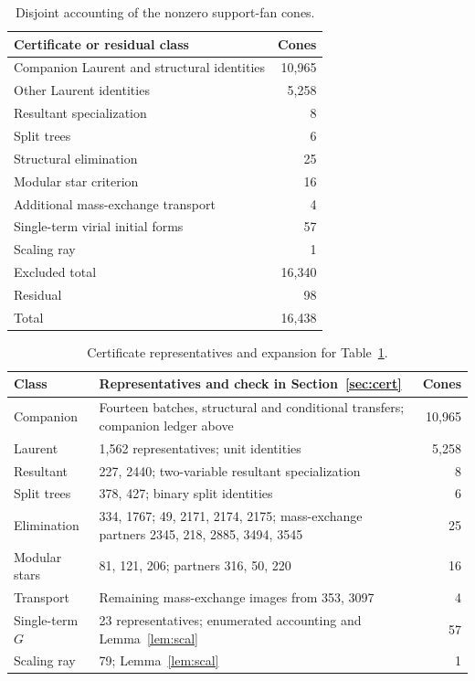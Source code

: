 \documentclass[11pt]{amsart}
\theoremstyle{definition}\newtheorem{definition}[theorem]{Definition}\theoremstyle{remark}\newtheorem{remark}[theorem]{Remark}
\begin{document}
\begin{table}[ht]
\centering
\caption{Disjoint accounting of the nonzero support-fan cones.}\label{tab:coverage}
\begin{tabular}{lr}
\toprule
Certificate or residual class&Cones\\
\midrule
Companion Laurent and structural identities&10,965\\
Other Laurent identities&5,258\\
Resultant specialization&8\\
Split trees&6\\
Structural elimination&25\\
Modular star criterion&16\\
Additional mass-exchange transport&4\\
Single-term virial initial forms&57\\
Scaling ray&1\\
\midrule
Excluded total&16,340\\
Residual&98\\
\midrule
Total&16,438\\
\bottomrule
\end{tabular}
\end{table}
\begin{table}[ht]
\centering\small\raggedright
\caption{Certificate representatives and expansion for Table~\ref{tab:coverage}.}\label{tab:representatives}
\begin{tabular}{p{1.13in}p{3.65in}r}
\toprule
Class&Representatives and check in Section~\ref{sec:cert}&Cones\\
\midrule
Companion&Fourteen batches, structural and conditional transfers; companion ledger above&10,965\\
Laurent&1,562 representatives; unit identities&5,258\\
Resultant&227, 2440; two-variable resultant specialization&8\\
Split trees&378, 427; binary split identities&6\\
Elimination&334, 1767; 49, 2171, 2174, 2175; mass-exchange partners 2345, 218, 2885, 3494, 3545&25\\
Modular stars&81, 121, 206; partners 316, 50, 220&16\\
Transport&Remaining mass-exchange images from 353, 3097&4\\
Single-term $G$&23 representatives; enumerated accounting and Lemma~\ref{lem:scal}&57\\
Scaling ray&79; Lemma~\ref{lem:scal}&1\\
\bottomrule
\end{tabular}
\end{table}
\end{document}
